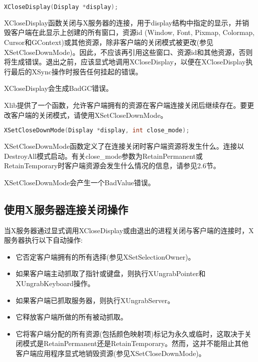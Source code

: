 \begin{lstlisting}[language=C]
XCloseDisplay(Display *display);
\end{lstlisting}

\noindent XCloseDisplay函数关闭与X服务器的连接，用于display结构中指定的显示，并销毁客户端在此显示上创建的所有窗口，资源id (Window, Font, Pixmap, Colormap, Cursor和GContext)或其他资源，除非客户端的关闭模式被更改(参见XSetCloseDownMode)。因此，不应该再引用这些窗口、资源id和其他资源，否则将生成错误。退出之前，应该显式地调用XCloseDisplay，以便在XCloseDisplay执行最后的XSync操作时报告任何挂起的错误。

\begin{note}
XCloseDisplay会生成BadGC错误。
\end{note}

\noindent Xlib提供了一个函数，允许客户端拥有的资源在客户端连接关闭后继续存在。要更改客户端的关闭模式，请使用XSetCloseDownMode。
\begin{lstlisting}[language=C]
XSetCloseDownMode(Display *display, int close_mode);
\end{lstlisting}

\noindent XSetCloseDownMode函数定义了在连接关闭时客户端资源将发生什么。连接以DestroyAll模式启动。有关close\_mode参数为RetainPermanent或RetainTemporary时客户端资源会发生什么情况的信息，请参见2.6节。

\begin{note}
XSetCloseDownMode会产生一个BadValue错误。
\end{note}

\subsection{使用X服务器连接关闭操作}

\noindent 当X服务器通过显式调用XCloseDisplay或由退出的进程关闭与客户端的连接时，X服务器执行以下自动操作:

\begin{itemize}
	\item 它否定客户端拥有的所有选择(参见XSetSelectionOwner)。
	\item 如果客户端主动抓取了指针或键盘，则执行XUngrabPointer和XUngrabKeyboard操作。
	\item 如果客户端已抓取服务器，则执行XUngrabServer。
	\item 它释放客户端所做的所有被动抓取。
	\item 它将客户端分配的所有资源(包括颜色映射项)标记为永久或临时，这取决于关闭模式是RetainPermanent还是RetainTemporary。然而，这并不能阻止其他客户端应用程序显式地销毁资源(参见XSetCloseDownMode)。
\end{itemize}

